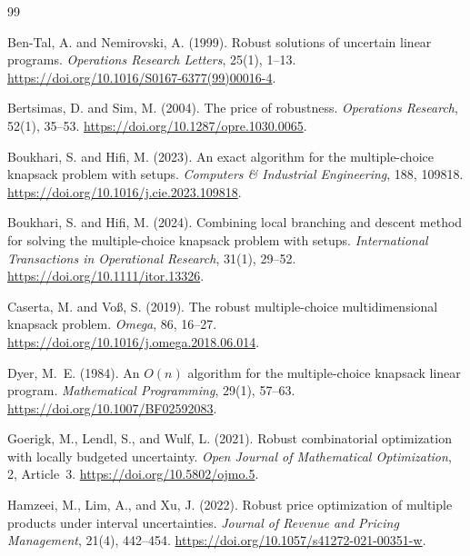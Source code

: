 \documentclass[11pt, a4paper]{article}
\theoremstyle{plain}
\theoremstyle{definition}
\theoremstyle{remark}
\begin{document}
\newpage

\begin{thebibliography}{99}

Ben-Tal, A. and Nemirovski, A. (1999).
\newblock Robust solutions of uncertain linear programs.
\newblock \emph{Operations Research Letters}, 25(1), 1--13.
\newblock \url{https://doi.org/10.1016/S0167-6377(99)00016-4}.

Bertsimas, D. and Sim, M. (2004).
\newblock The price of robustness.
\newblock \emph{Operations Research}, 52(1), 35--53.
\newblock \url{https://doi.org/10.1287/opre.1030.0065}.

Boukhari, S. and Hifi, M. (2023).
\newblock An exact algorithm for the multiple-choice knapsack problem with setups.
\newblock \emph{Computers \& Industrial Engineering}, 188, 109818.
\newblock \url{https://doi.org/10.1016/j.cie.2023.109818}.

Boukhari, S. and Hifi, M. (2024).
\newblock Combining local branching and descent method for solving the multiple-choice knapsack problem with setups.
\newblock \emph{International Transactions in Operational Research}, 31(1), 29--52.
\newblock \url{https://doi.org/10.1111/itor.13326}.

Caserta, M. and Vo{\ss}, S. (2019).
\newblock The robust multiple-choice multidimensional knapsack problem.
\newblock \emph{Omega}, 86, 16--27.
\newblock \url{https://doi.org/10.1016/j.omega.2018.06.014}.

Dyer, M.~E. (1984).
\newblock An $O(n)$ algorithm for the multiple-choice knapsack linear program.
\newblock \emph{Mathematical Programming}, 29(1), 57--63.
\newblock \url{https://doi.org/10.1007/BF02592083}.

Goerigk, M., Lendl, S., and Wulf, L. (2021).
\newblock Robust combinatorial optimization with locally budgeted uncertainty.
\newblock \emph{Open Journal of Mathematical Optimization}, 2, Article~3.
\newblock \url{https://doi.org/10.5802/ojmo.5}.

Hamzeei, M., Lim, A., and Xu, J. (2022).
\newblock Robust price optimization of multiple products under interval uncertainties.
\newblock \emph{Journal of Revenue and Pricing Management}, 21(4), 442--454.
\newblock \url{https://doi.org/10.1057/s41272-021-00351-w}.


\end{thebibliography}
\end{document}
